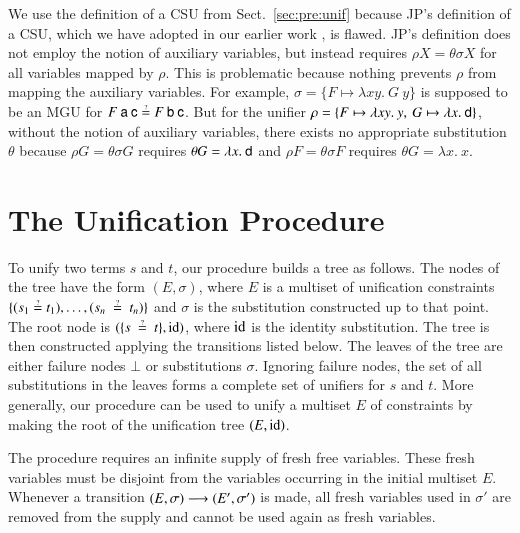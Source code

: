 We use the definition of a CSU from Sect.~\ref{sec:pre:unif} because 
JP's definition of a CSU, which we have adopted in our earlier work \cite{vbn-21-unif}, is flawed.
JP's definition does not employ the notion of auxiliary variables,
but instead requires $\rho X = \theta\sigma X$ for all variables mapped by $\rho$.
This is problematic because nothing prevents $\rho$ from mapping the auxiliary variables.
For example, $\sigma = \{F \mapsto \lambda x y.\> G\>y\}$ is supposed
to be an MGU for $F\>\cst{a}\>\cst{c} \unif F\>\cst{b}\>\cst{c}$.
But for the unifier $\rho = \{F \mapsto \lambda x y.\> y,\> G \mapsto \lambda x.\> \mathsf{d}\}$,
without the notion of auxiliary variables,
there exists no appropriate substitution $\theta$
because $\rho G = \theta\sigma G$ requires $\theta G = \lambda x.\> \mathsf{d}$
and $\rho F = \theta\sigma F$ requires $\theta G = \lambda x.\> x$.



\section{The Unification Procedure}
\label{sec:unif:the-unification-procedure}

To unify two terms $s$ and $t$, our procedure builds a tree as follows. The
nodes of the tree have the form $(E,\sigma)$, where $E$ is a multiset of
unification constraints $\{(s_1 \unif t_1), \ldots, (s_n~\unif~t_n)\}$ and
$\sigma$ is the substitution constructed up to that point.  The root node is $(\{s~\unif~t\}, \makeop{id})$, where $\operatorname{id}$ is the identity
substitution. The tree is then constructed applying the transitions listed
below. The leaves of the tree are either failure nodes  $\bot$ or substitutions
$\sigma$. Ignoring failure nodes, the set of all substitutions in the leaves
forms a complete set of unifiers for $s$ and $t$. More generally, our procedure can be used to
unify a multiset $E$ of constraints by making the root of the unification tree
$(E, \operatorname{id})$.

The procedure requires an infinite supply of fresh free variables. These fresh
variables must be disjoint from the variables occurring in the initial multiset
$E$. Whenever a transition $(E,\sigma) \longrightarrow (E',\sigma')$ is made, all
fresh variables used in $\sigma'$ are removed from the supply and cannot be used
again as fresh variables.

